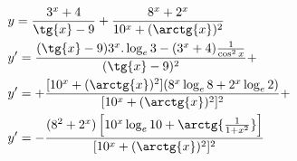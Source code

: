 \begin{ex}
\begin{align}
&y=\frac{3^x+4}{\tg{x}-9}+\frac{8^x+2^x}{10^x+(\arctg{x})^2}\nonumber\\
&y'=\frac{(\tg{x}-9)3^x.\log_{e}{3}-(3^x+4)\frac{1}{\cos^2{x}}}{(\tg{x}-9)^2}+\nonumber\\
&y'=+\frac{[10^x+(\arctg{x})^2](8^x\log_{e}{8}+2^x\log_{e}{2})}{[10^x+(\arctg{x})^2]^2}+\nonumber\\
&y'=-\frac{(8^2+2^x)\left[10^x\log_{e}{10}+\arctg{\frac{1}{1+x^2}}\right]}{[10^x+(\arctg{x})^2]^2}\nonumber
\end{align}
\end{ex}